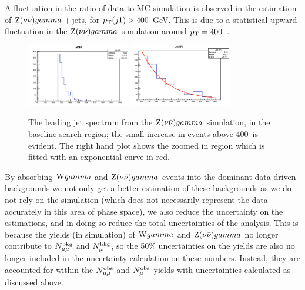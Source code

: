 A fluctuation in the ratio of data to MC simulation is observed in the estimation of $\mathrm{Z} ( \nu \bar{\nu} ) gamma$\,+\,jets, for $p_{\text{T}}(j1) > 400$ GeV.
This is due to a statistical upward fluctuation in the $\mathrm{Z} ( \nu \bar{\nu} ) gamma$ simulation around $p_{\text{T}}=400$~\GeV.


\begin{figure}[htbp!]
\begin{center}
  \includegraphics[width=0.4\textwidth]{Figures/sus13009/j1pt_zvvG_simulation.pdf} 
  \includegraphics[width=0.4\textwidth]{Figures/sus13009/j1pt_zvvG_simulation_fit.pdf} 
\caption{The leading jet \pt spectrum from the $\mathrm{Z} ( \nu \bar{\nu} ) gamma$ simulation, in the baseline search region; the small increase in events above 400~\GeV is evident. The right hand plot shows the zoomed in region which is fitted with an exponential curve in red.}
\label{fig:zvvG_bump}
\end{center}
\end{figure}


By absorbing $\mathrm{W}gamma$ and $\mathrm{Z} ( \nu \bar{\nu} ) gamma$ events into the dominant data driven backgrounds 
we not only get a better estimation of these backgrounds as we do not rely on the simulation 
(which does not necessarily represent the data accurately in this area of phase space), 
we also reduce the uncertainty on the estimations, 
and in doing so reduce the total uncertainties of the analysis.
This is because the yields (in simulation) of $\mathrm{W}gamma$ and $\mathrm{Z} ( \nu \bar{\nu} ) gamma$ no longer contribute to $N^{\rm bkg}_{\mu\mu}$ and $N^{\rm bkg}_{\mu}$, so the 50\% uncertainties on the yields are also no longer included in the uncertainty calculation on these numbers. 
Instead, they are accounted for within the $N^{\rm obs}_{\mu\mu}$ and $N^{\rm obs}_{\mu}$ yields with uncertainties calculated as discussed above.


